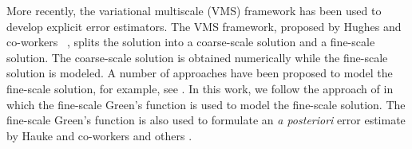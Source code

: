 More recently, the variational multiscale (VMS) framework has been used to develop explicit error estimators. 
The VMS framework, proposed by Hughes and co-workers ~\cite{hughes1995multiscale,hughes1998variational}, splits the solution into a coarse-scale solution and a fine-scale solution. 
The coarse-scale solution is obtained numerically while the fine-scale solution is modeled. 
A number of approaches have been proposed to model the fine-scale solution, for example, see \cite{brezzi1997b,brezzi1992relationship,brezzi1994choosing,codina2002stabilized,hughes2007variational,principe2010stabilization}. 
In this work, we follow the approach of \cite{hughes2007variational} in which the fine-scale Green's function is used to model the fine-scale solution. 
The fine-scale Green's function is also used to formulate an \textit{a posteriori} error estimate by Hauke and co-workers \cite{hauke2006proper,hauke2006multiscale,hauke2008variational,hauke2012mesh,hauke2014recent,hauke2015variational,irisarri2016posteriori} and others \cite{bayona2018variational}.


